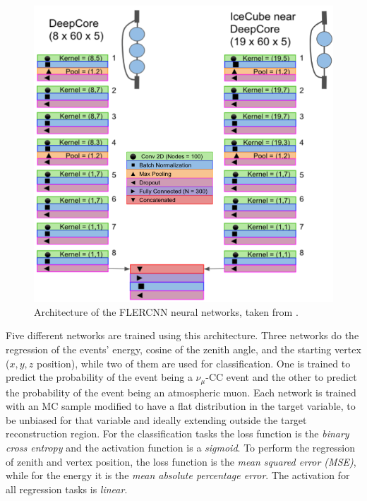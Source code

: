 \begin{figure}
    \includegraphics{figures/simulation_and_processing/flercnn/Detailed_CNN_Architecture_combined.png}
	\caption[FLERCNN architecture]{Architecture of the FLERCNN neural networks, taken from \cite{flercnn_proceedings}.}
\end{figure}

Five different networks are trained using this architecture. Three networks do the regression of the events' energy, cosine of the zenith angle, and the starting vertex ($x,y,z$ position), while two of them are used for classification. One is trained to predict the probability of the event being a $\nu_\mu$-CC event and the other to predict the probability of the event being an atmospheric muon. Each network is trained with an MC sample modified to have a flat distribution in the target variable, to be unbiased for that variable and ideally extending outside the target reconstruction region. For the classification tasks the loss function is the \textit{binary cross entropy} and the activation function is a \textit{sigmoid}. To perform the regression of zenith and vertex position, the loss function is the \textit{mean squared error (MSE)}, while for the energy it is the \textit{mean absolute percentage error}. The activation for all regression tasks is \textit{linear}.

